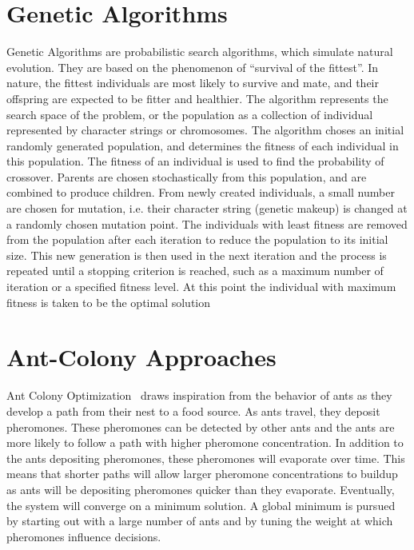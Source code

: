 \documentclass[10pt,twocolumn,notitlepage]{article}
\begin{document}
\section{Genetic Algorithms}
Genetic Algorithms are probabilistic search algorithms, which simulate natural evolution. They are based on the phenomenon of “survival of the fittest”. In nature, the fittest individuals are most likely to survive and mate, and their offspring are expected to be fitter and healthier.
The algorithm represents the search space of the problem, or the population as a collection of individual represented by character strings or chromosomes. The algorithm choses an initial randomly generated population, and determines the fitness of each individual in this population. The fitness of an individual is used to find the probability of crossover. Parents are chosen stochastically from this population, and are combined to produce children. From newly created individuals, a small number are chosen for mutation, i.e. their character string (genetic makeup) is changed at a randomly chosen mutation point. The individuals with least fitness are removed from the population after each iteration to reduce the population to its initial size. This new generation is then used in the next iteration and the process is repeated until a stopping criterion is reached, such as a maximum number of iteration or a specified fitness level. At this point the individual with maximum fitness is taken to be the optimal solution

\section{Ant-Colony Approaches}
Ant Colony Optimization~\cite{Dorigo96theant} draws inspiration from the behavior of ants as they develop a path from their nest to a food source.  As ants travel, they deposit pheromones.  These pheromones can be detected by other ants and the ants are more likely to follow a path with higher pheromone concentration.  In addition to the ants depositing pheromones, these pheromones will evaporate over time.  This means that shorter paths will allow larger pheromone concentrations to buildup as ants will be depositing pheromones quicker than they evaporate.  Eventually, the system will converge on a minimum solution.  A global minimum is pursued by starting out with a large number of ants and by tuning the weight at which pheromones influence decisions. 
\end{document}
